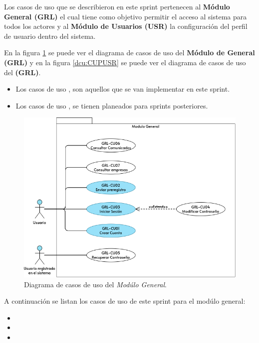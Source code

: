     Los casos de uso que se describieron en este sprint pertenecen al \textbf{Módulo General (GRL)} el cual tiene como objetivo 
    permitir el acceso al sistema para todos los actores y al \textbf{Módulo de Usuarios (USR)} la configuración del perfil de usuario dentro del sistema.

    En la figura \ref{dcu:MUSR} se puede ver el diagrama de casos de uso del \textbf{Módulo de General (GRL)} y en la figura 
    \ref{dcu:CUPUSR} se puede ver el diagrama de casos de uso del \textbf{(GRL)}.
    \begin{itemize}
        \item Los casos de uso \IUazul{} , son aquellos que se van implementar en este sprint.
        \item Los casos de uso \IUblanco{}, se tienen planeados para sprints posteriores.
    \end{itemize} 

    \begin{figure}[H]
        \begin{center}
            \includegraphics[width=.7\textwidth]{sprints/imagenes/CUGRL.png}
        \end{center}
        \caption{Diagrama de casos de uso del \textit{Modúlo General}.}
        \label{dcu:MUSR}
    \end{figure}

    A continuación se listan los casos de uso de este sprint para el modúlo general:
    \begin{itemize}
        \item {}
        \item {}
        \item {}
    \end{itemize} 

